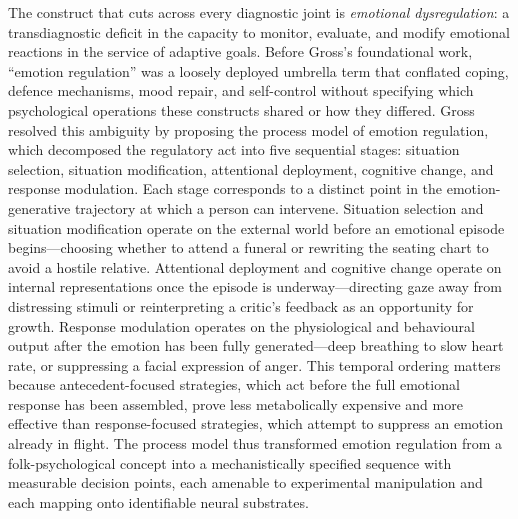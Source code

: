 The construct that cuts across every diagnostic joint is \emph{emotional
dysregulation}: a transdiagnostic deficit in the capacity to monitor,
evaluate, and modify emotional reactions in the service of adaptive goals.
Before Gross's foundational work, ``emotion regulation'' was a loosely
deployed umbrella term that conflated coping, defence mechanisms, mood
repair, and self-control without specifying which psychological operations
these constructs shared or how they differed.  Gross resolved this
ambiguity by proposing the process model of emotion regulation, which
decomposed the regulatory act into five sequential stages: situation
selection, situation modification, attentional deployment, cognitive
change, and response modulation.\cite{gross2002}  Each stage corresponds to a
distinct point in the emotion-generative trajectory at which a person can
intervene.  Situation selection and situation modification operate on the
external world before an emotional episode begins---choosing whether to
attend a funeral or rewriting the seating chart to avoid a hostile
relative.  Attentional deployment and cognitive change operate on internal
representations once the episode is underway---directing gaze away from
distressing stimuli or reinterpreting a critic's feedback as an
opportunity for growth.  Response modulation operates on the physiological
and behavioural output after the emotion has been fully generated---deep
breathing to slow heart rate, or suppressing a facial expression of anger.
This temporal ordering matters because antecedent-focused strategies, which
act before the full emotional response has been assembled, prove less
metabolically expensive and more effective than response-focused
strategies, which attempt to suppress an emotion already in flight.\cite{gross2002}
The process model thus transformed emotion regulation from a
folk-psychological concept into a mechanistically specified sequence with
measurable decision points, each amenable to experimental manipulation and
each mapping onto identifiable neural substrates.

